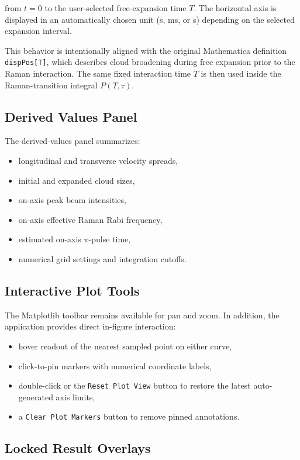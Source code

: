 \documentclass[11pt,a4paper]{article}
\begin{document}
from $t = 0$ to the user-selected free-expansion time $T$. The horizontal axis is displayed in an
automatically chosen unit (\textmu s, ms, or s) depending on the selected expansion interval.

This behavior is intentionally aligned with the original Mathematica definition
\texttt{dispPos[T]}, which describes cloud broadening during free expansion prior to the Raman
interaction. The same fixed interaction time $T$ is then used inside the Raman-transition integral
$P(T,\tau)$.

\subsection{Derived Values Panel}

The derived-values panel summarizes:

\begin{itemize}
  \item longitudinal and transverse velocity spreads,
  \item initial and expanded cloud sizes,
  \item on-axis peak beam intensities,
  \item on-axis effective Raman Rabi frequency,
  \item estimated on-axis $\pi$-pulse time,
  \item numerical grid settings and integration cutoffs.
\end{itemize}

\subsection{Interactive Plot Tools}

The Matplotlib toolbar remains available for pan and zoom. In addition, the application provides
direct in-figure interaction:

\begin{itemize}
  \item hover readout of the nearest sampled point on either curve,
  \item click-to-pin markers with numerical coordinate labels,
  \item double-click or the \texttt{Reset Plot View} button to restore the latest auto-generated axis limits,
  \item a \texttt{Clear Plot Markers} button to remove pinned annotations.
\end{itemize}

\subsection{Locked Result Overlays}
\end{document}
